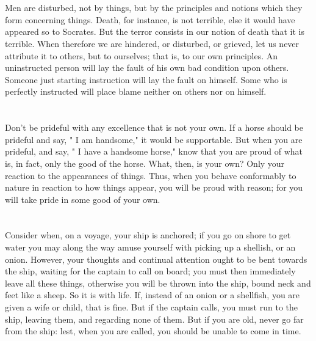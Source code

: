 \documentclass[12pt]{article}
\begin{document}
\section{}

Men are disturbed, not by things, but by the principles and notions
which they form concerning things. Death, for instance, is not terrible,
else it would have appeared so to Socrates. But the terror consists
in our notion of death that it is terrible. When therefore we are
hindered, or disturbed, or grieved, let us never attribute it to others,
but to ourselves; that is, to our own principles. An uninstructed
person will lay the fault of his own bad condition upon others. Someone
just starting instruction will lay the fault on himself. Some who
is perfectly instructed will place blame neither on others nor on
himself. 

\section{}

Don't be prideful with any excellence that is not your own. If
a horse should be prideful and say, " I am handsome," it would be
supportable. But when you are prideful, and say, " I have a handsome
horse," know that you are proud of what is, in fact, only the good
of the horse. What, then, is your own? Only your reaction to the appearances
of things. Thus, when you behave conformably to nature in reaction
to how things appear, you will be proud with reason; for you will
take pride in some good of your own. 

\section{}

Consider when, on a voyage, your ship is anchored; if you go on
shore to get water you may along the way amuse yourself with picking
up a shellish, or an onion. However, your thoughts and continual attention
ought to be bent towards the ship, waiting for the captain to call
on board; you must then immediately leave all these things, otherwise
you will be thrown into the ship, bound neck and feet like a sheep.
So it is with life. If, instead of an onion or a shellfish, you are
given a wife or child, that is fine. But if the captain calls, you
must run to the ship, leaving them, and regarding none of them. But
if you are old, never go far from the ship: lest, when you are called,
you should be unable to come in time. 
\end{document}
